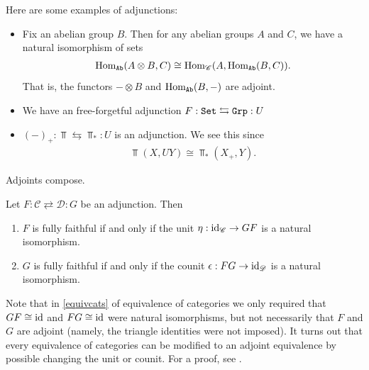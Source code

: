 \documentclass{article}[11pt]
\begin{document}


\begin{examples}\label{exs:adjunctions} Here are some examples of adjunctions:
\begin{itemize}
	\item Fix an abelian group $B$. Then for any abelian groups $A$ and $C$, we have a natural isomorphism of sets
\begin{align*}
	\textup{Hom}_{\texttt{Ab}} (A\otimes B, C) \cong \textup{Hom}_{\mathscr{C}}(A, \textup{Hom}_{\texttt{Ab}} (B,C)).
\end{align*}
That is, the functors $-\otimes B$ and $\textup{Hom}_{\texttt{Ab}} (B, -)$ are adjoint.
	\item We have an free-forgetful adjunction $F: \texttt{Set} \leftrightarrows \texttt{Grp} : U$
	\item $(-)_+ : \Top \leftrightarrows \Top_\ast: U$ is an adjunction. We see this since
	\begin{align*}
		\Top(X,UY) \cong \Top_\ast (X_+, Y).
	\end{align*}
\end{itemize}
\end{examples}



\begin{proposition} Adjoints compose.
\end{proposition}

\begin{exercise}\label{exer:left-adjoint-fully-faithful-iff-unit-natural-iso}
Let $F : \mathscr{C} \rightleftarrows \mathscr{D} : G$ be an adjunction. Then
\begin{enumerate}
    \item $F$ is fully faithful if and only if the unit $\eta: \text{id}_\mathscr{C} \to GF$ is a natural isomorphism.
    \item $G$ is fully faithful if and only if the counit $\epsilon : FG \to \text{id}_\mathscr{D}$ is a natural isomorphism.
\end{enumerate}

\end{exercise}



Note that in \autoref{equivcats} of equivalence of categories we only required that $GF\cong\text{id} $ and $FG\cong \text{id}$ were natural isomorphisms, but not necessarily that $F$ and $G$ are adjoint (namely, the triangle identities were not imposed). It turns out that every equivalence of categories can be modified to an adjoint equivalence by possible changing the unit or counit. For a proof, see \cite[Lemma 3.10]{mehrle}.
\end{document}
